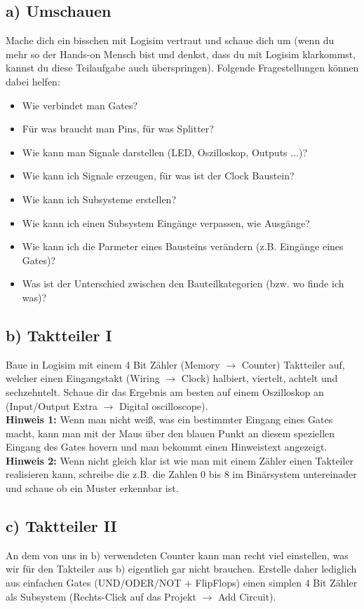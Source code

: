 \documentclass[a4paper]{scrartcl}
\begin{document}
\subsection*{a) Umschauen}
Mache dich ein bisschen mit Logisim vertraut und schaue dich um (wenn du mehr so der Hands-on Mensch bist und denkst, dass du mit Logisim klarkommst, kannst du diese Teilaufgabe auch überspringen). Folgende Fragestellungen können dabei helfen:
\begin{itemize}
	\item Wie verbindet man Gates?
	\item Für was braucht man Pins, für was Splitter?
	\item Wie kann man Signale darstellen (LED, Oszilloskop, Outputs ...)?
	\item Wie kann ich Signale erzeugen, für was ist der Clock Baustein?
	\item Wie kann ich Subsysteme erstellen?
	\item Wie kann ich einen Subsystem Eingänge verpassen, wie Ausgänge?
	\item Wie kann ich die Parmeter eines Bausteins verändern (z.B. Eingänge eines Gates)?
	\item Was ist der Unterschied zwischen den Bauteilkategorien (bzw. wo finde ich was)?
\end{itemize}

\subsection*{b) Taktteiler I}
Baue in Logisim mit einem 4 Bit Zähler (Memory $\rightarrow$ Counter) Taktteiler auf, welcher einen Eingangstakt (Wiring $\rightarrow$ Clock) halbiert, viertelt, achtelt und sechzehntelt. Schaue dir das Ergebnis am besten auf einem Oszilloskop an (Input/Output Extra $\rightarrow$ Digital oscilloscope).\\

\textbf{Hinweis 1:} Wenn man nicht weiß, was ein bestimmter Eingang eines Gates macht, kann man mit der Maus über den blauen Punkt an diesem speziellen Eingang des Gates hovern und man bekommt einen Hinweistext angezeigt.\\
\textbf{Hinweis 2:} Wenn nicht gleich klar ist wie man mit einem Zähler einen Takteiler realisieren kann, schreibe die z.B. die Zahlen 0 bis 8 im Binärsystem untereinader und schaue ob ein Muster erkennbar ist.\\

\subsection*{c) Taktteiler II}
An dem von uns in b) verwendeten Counter kann man recht viel einstellen, was wir für den Takteiler aus b) eigentlich gar nicht brauchen. Erstelle daher lediglich aus einfachen Gates (UND/ODER/NOT + FlipFlops) einen simplen 4 Bit Zähler als Subsystem (Rechts-Click auf das Projekt $\rightarrow$ Add Circuit).
\end{document}
